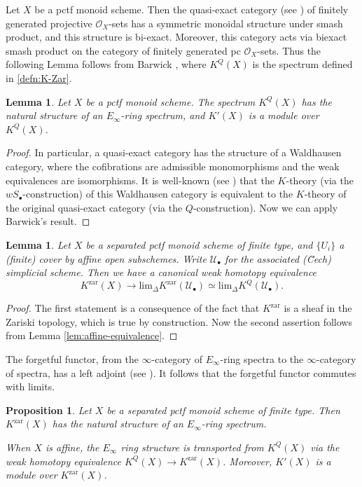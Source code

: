 \documentclass[12pt]{amsart}
\def\Kzar{K^{\mathrm{zar}}}
\def\KQ{K^Q}
\numberwithin{equation}{section}
\theoremstyle{plain}
\newtheorem{prop}[equation]{Proposition}
\newtheorem{lem}[equation]{Lemma}
\theoremstyle{definition}
\theoremstyle{remark}
\begin{document}
Let $X$ be a pctf monoid scheme. Then the quasi-exact category (see
\cite[Section 2]{HW}) of finitely generated projective
$\mathcal{O}_X$-sets has a symmetric monoidal structure under smash
product, and this structure is bi-exact. Moreover, this category acts
via biexact smash product on the category of finitely generated pc
$\mathcal{O}_X$-sets.  Thus the following Lemma follows from Barwick
\cite[Cor.\,3.8.2]{Barwick},
where $K^Q(X)$ is the  spectrum defined in \ref{defn:K-Zar}.

\begin{lem}\label{lem:K_is_ring}
  Let $X$ be a pctf monoid scheme. The spectrum $\KQ(X)$
  has the natural structure of an $E_\infty$-ring spectrum,
  and $K'(X)$ is a module over $\KQ(X)$. 
\end{lem}

\begin{proof}
In particular, a quasi-exact category has the structure of a
Waldhausen category, where the cofibrations are admissible
monomorphisms and the weak equivalences are isomorphisms. It is
well-known (see \cite[1.9]{Waldhausen1126}) that the $K$-theory (via the
$wS_\bullet$-construction) of this Waldhausen category is equivalent
to the $K$-theory of the original quasi-exact category (via the
$Q$-construction). Now we can apply Barwick's result.
\end{proof}

\begin{lem}\label{lem:Kzar-as-finite-limit}
  Let $X$ be a separated pctf monoid scheme of finite type, and $\{U_i\}$
  a (finite) cover by affine open subschemes. Write $\mathcal{U}_\bullet$
  for the associated (\u{C}ech) simplicial scheme.
  Then we have a canonical weak homotopy equivalence
\[ \Kzar(X)\to \mathrm{lim}_{\Delta} \Kzar (\mathcal{U}_\bullet)
\simeq \mathrm{lim}_{\Delta} \KQ(\mathcal{U}_\bullet).
\]
\end{lem}

\begin{proof}
The first statement is a consequence of the fact that $\Kzar$ is a
sheaf in the Zariski topology, which is true by construction. Now the
second assertion follows from Lemma \ref{lem:affine-equivalence}.
\end{proof}

The forgetful functor, from the $\infty$-category of $E_\infty$-ring
spectra to the $\infty$-category of spectra, has a left adjoint (see
\cite{Harper}). It follows that the forgetful functor commutes with limits.

\begin{prop}\label{prop:Kzar-is-ring}
  Let $X$ be a separated pctf monoid scheme of finite type.
Then $\Kzar(X)$ has the natural structure of an $E_\infty$-ring spectrum. 
	
When $X$ is affine, the $E_\infty$ ring structure is transported from
$\KQ(X)$ via the weak homotopy equivalence $\KQ(X)\to
\Kzar(X)$. Moreover, $K'(X)$ is a module over $\Kzar(X)$.
\end{prop}
\end{document}
